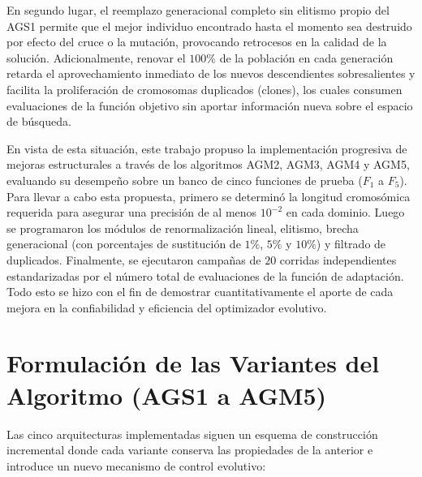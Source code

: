 \documentclass[11pt,letterpaper]{article}
\begin{document}
En segundo lugar, el reemplazo generacional completo sin elitismo propio del AGS1 permite que el mejor individuo encontrado hasta el momento sea destruido por efecto del cruce o la mutación, provocando retrocesos en la calidad de la solución. Adicionalmente, renovar el $100\%$ de la población en cada generación retarda el aprovechamiento inmediato de los nuevos descendientes sobresalientes y facilita la proliferación de cromosomas duplicados (clones), los cuales consumen evaluaciones de la función objetivo sin aportar información nueva sobre el espacio de búsqueda.

En vista de esta situación, este trabajo propuso la implementación progresiva de mejoras estructurales a través de los algoritmos AGM2, AGM3, AGM4 y AGM5, evaluando su desempeño sobre un banco de cinco funciones de prueba ($F_1$ a $F_5$). Para llevar a cabo esta propuesta, primero se determinó la longitud cromosómica requerida para asegurar una precisión de al menos $10^{-2}$ en cada dominio. Luego se programaron los módulos de renormalización lineal, elitismo, brecha generacional (con porcentajes de sustitución de $1\%$, $5\%$ y $10\%$) y filtrado de duplicados. Finalmente, se ejecutaron campañas de $20$ corridas independientes estandarizadas por el número total de evaluaciones de la función de adaptación. Todo esto se hizo con el fin de demostrar cuantitativamente el aporte de cada mejora en la confiabilidad y eficiencia del optimizador evolutivo.

\section{Formulación de las Variantes del Algoritmo (AGS1 a AGM5)}
Las cinco arquitecturas implementadas siguen un esquema de construcción incremental donde cada variante conserva las propiedades de la anterior e introduce un nuevo mecanismo de control evolutivo:
\end{document}
